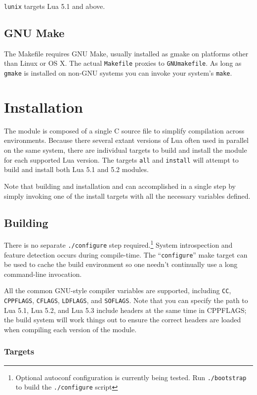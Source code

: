 \documentclass[11pt, oneside]{memoir}
\newcommand*{\lunix}[0]{\texttt{lunix}\xspace}
\begin{document}
\lunix targets Lua 5.1 and above.

\section{GNU Make}

The Makefile requires GNU Make, usually installed as gmake on platforms other than Linux or OS X. The actual \texttt{Makefile} proxies to \texttt{GNUmakefile}. As long as \texttt{gmake} is installed on non-GNU systems you can invoke your system's \texttt{make}.

\chapter{Installation}

The module is composed of a single C source file to simplify compilation across environments. Because there several extant versions of Lua often used in parallel on the same system, there are individual targets to build and install the module for each supported Lua version. The targets \texttt{all} and \texttt{install} will attempt to build and install both Lua 5.1 and 5.2 modules.

Note that building and installation and can accomplished in a single step by simply invoking one of the install targets with all the necessary variables defined.

\section{Building}

There is no separate \texttt{./configure} step required.\footnote{Optional autoconf configuration is currently being tested. Run \texttt{./bootstrap} to build the \texttt{./configure} script} System introspection and feature detection occurs during compile-time. The ``\texttt{configure}'' make target can be used to cache the build environment so one needn't continually use a long command-line invocation.

All the common GNU-style compiler variables are supported, including \texttt{CC}, \texttt{CPPFLAGS}, \texttt{CFLAGS}, \texttt{LDFLAGS}, and \texttt{SOFLAGS}. Note that you can specify the path to Lua 5.1, Lua 5.2, and Lua 5.3 include headers at the same time in CPPFLAGS; the build system will work things out to ensure the correct headers are loaded when compiling each version of the module.

\subsection{Targets}
\end{document}
